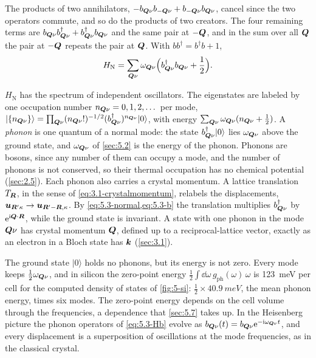 The products of two annihilators, $-b_{\bm{Q}\nu}b_{-\bm{Q}\nu} + b_{-\bm{Q}\nu}b_{\bm{Q}\nu}$, cancel since the two operators commute, and so do the products of two creators. The four remaining terms are $b_{\bm{Q}\nu}b^\dagger_{\bm{Q}\nu} + b^\dagger_{\bm{Q}\nu}b_{\bm{Q}\nu}$ and the same pair at $-\bm{Q}$, and in the sum over all $\bm{Q}$ the pair at $-\bm{Q}$ repeats the pair at $\bm{Q}$. With $bb^\dagger = b^\dagger b + 1$,
\begin{equation}
  H_{\mathrm{N}} = \sum_{\bm{Q}\nu}\omega_{\bm{Q}\nu}\Bigl(b^\dagger_{\bm{Q}\nu}b_{\bm{Q}\nu} + \frac12\Bigr) .
  \label{eq:5.3-Hb}
\end{equation}

$H_{\mathrm{N}}$ has the spectrum of independent oscillators. The eigenstates are labeled by one occupation number $n_{\bm{Q}\nu} = 0, 1, 2, \dots$ per mode, $|\{n_{\bm{Q}\nu}\}\rangle = \prod_{\bm{Q}\nu}(n_{\bm{Q}\nu}!)^{-1/2}(b^\dagger_{\bm{Q}\nu})^{n_{\bm{Q}\nu}}|0\rangle$, with energy $\sum_{\bm{Q}\nu}\omega_{\bm{Q}\nu}(n_{\bm{Q}\nu} + \tfrac12)$. A \emph{phonon} is one quantum of a normal mode: the state $b^\dagger_{\bm{Q}\nu}|0\rangle$ lies $\omega_{\bm{Q}\nu}$ above the ground state, and $\omega_{\bm{Q}\nu}$ of \cref{sec:5.2} is the energy of the phonon. Phonons are bosons, since any number of them can occupy a mode, and the number of phonons is not conserved, so their thermal occupation has no chemical potential (\cref{sec:2.5}). Each phonon also carries a crystal momentum. A lattice translation $T_{\bm{R}}$, in the sense of \cref{eq:3.1-crystalmomentum}, relabels the displacements, $\bm{u}_{\bm{R}'\kappa} \to \bm{u}_{\bm{R}'-\bm{R},\kappa}$. By \cref{eq:5.3-normal,eq:5.3-b} the translation multiplies $b^\dagger_{\bm{Q}\nu}$ by $\mathrm{e}^{\mathrm{i}\bm{Q}\cdot\bm{R}}$, while the ground state is invariant. A state with one phonon in the mode $\bm{Q}\nu$ has crystal momentum $\bm{Q}$, defined up to a reciprocal-lattice vector, exactly as an electron in a Bloch state has $\bm{k}$ (\cref{sec:3.1}).

The ground state $|0\rangle$ holds no phonons, but its energy is not zero. Every mode keeps $\tfrac12\omega_{\bm{Q}\nu}$, and in silicon the zero-point energy $\tfrac12\int\dd\omega\,g_{\mathrm{ph}}(\omega)\,\omega$ is \SI{123}{meV} per cell for the computed density of states of \cref{fig:5-si}: $\tfrac12\times\SI{40.9}{meV}$, the mean phonon energy, times six modes. The zero-point energy depends on the cell volume through the frequencies, a dependence that \cref{sec:5.7} takes up. In the Heisenberg picture the phonon operators of \cref{eq:5.3-Hb} evolve as $b_{\bm{Q}\nu}(t) = b_{\bm{Q}\nu}\mathrm{e}^{-\mathrm{i}\omega_{\bm{Q}\nu}t}$, and every displacement is a superposition of oscillations at the mode frequencies, as in the classical crystal.

